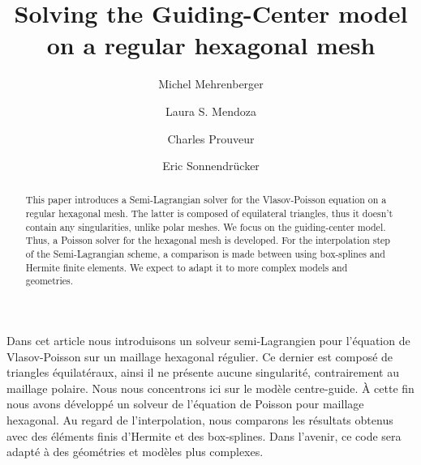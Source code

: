 \documentclass[proc]{edpsmath}
\begin{document}

\title{Solving the Guiding-Center model\\on a regular hexagonal mesh}%
%
\author{Michel Mehrenberger} \address{IRMA, Universit\'e de Strasbourg, 7, rue Ren\'e Descartes, 67084 Strasbourg \& INRIA-Nancy Grand-Est, projet TONUS, 
}
\author{Laura S. Mendoza} \address{Max-Planck-Institut f\"{u}r Plasmaphysik, Boltzmannstr. 2, D-85748 Garching bei M\"unchen, Germany. } 
\author{Charles Prouveur}\address{Universit\'e de Lyon, UMR5208, Institut Camille Jordan,
43 boulevard 11 novembre 1918, F-69622 Villeurbanne cedex, France}
\author{Eric Sonnendr\"{u}cker}
%
%


\begin{abstract} 
This paper introduces a Semi-Lagrangian solver for the Vlasov-Poisson equation on a regular hexagonal mesh. The latter is composed of equilateral triangles, thus it doesn't contain any singularities, unlike polar meshes. We focus on the guiding-center model. Thus, a Poisson solver for the hexagonal mesh is developed. For the interpolation step of the Semi-Lagrangian scheme, a comparison is made between using box-splines and Hermite finite elements. We expect to adapt it to more complex models and geometries.
\end{abstract}

\begin{resume} 
Dans cet article nous introduisons un solveur semi-Lagrangien pour l'\'equation de Vlasov-Poisson sur un maillage hexagonal r\'egulier. Ce dernier est compos\'e de triangles \'equilat\'eraux, ainsi il ne pr\'esente aucune singularit\'e, contrairement au maillage polaire. Nous nous concentrons ici sur le mod\`ele centre-guide. \`A cette fin nous avons d\'evelopp\'e un solveur de l'\'equation de Poisson pour maillage hexagonal. Au regard de l'interpolation, nous comparons les r\'esultats obtenus avec des \'el\'ements finis d'Hermite et des box-splines.   Dans l'avenir, ce code sera adapt\'e \`a des g\'eom\'etries et mod\`eles plus complexes.  
\end{resume}
\end{document}
